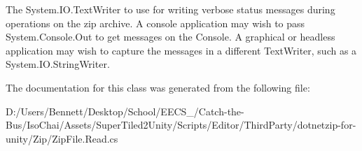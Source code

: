 The {\ttfamily System.\+I\+O.\+Text\+Writer} to use for writing verbose status messages during operations on the zip archive. A console application may wish to pass {\ttfamily System.\+Console.\+Out} to get messages on the Console. A graphical or headless application may wish to capture the messages in a different {\ttfamily Text\+Writer}, such as a {\ttfamily System.\+I\+O.\+String\+Writer}. 



The documentation for this class was generated from the following file\+:\begin{DoxyCompactItemize}
\item 
D\+:/\+Users/\+Bennett/\+Desktop/\+School/\+E\+E\+C\+S\+\_/\+Catch-\/the-\/\+Bus/\+Iso\+Chai/\+Assets/\+Super\+Tiled2\+Unity/\+Scripts/\+Editor/\+Third\+Party/dotnetzip-\/for-\/unity/\+Zip/Zip\+File.\+Read.\+cs\end{DoxyCompactItemize}
